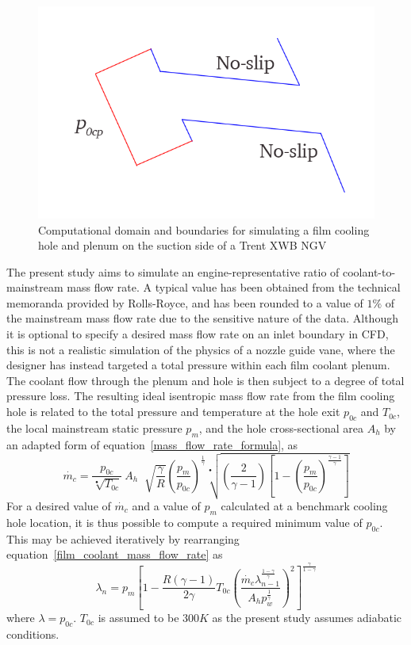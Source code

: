 \documentclass[a4paper, 11pt, oneside]{report}
\begin{document}
\begin{figure}[H]
	\centering
	\includegraphics[width=.45\textwidth]{figs/film_cooling_hole_boundary_conditions.png}
	\caption{Computational domain and boundaries for simulating a film cooling hole and plenum on the suction side of a Trent XWB NGV}
    \label{fig:film_cooling_hole_boundary_conditions}
\end{figure}

The present study aims to simulate an engine-representative ratio of coolant-to-mainstream mass flow rate. A typical value has been obtained from the technical memoranda provided by Rolls-Royce, and has been rounded to a value of $1\%$ of the mainstream mass flow rate due to the sensitive nature of the data. Although it is optional to specify a desired mass flow rate on an inlet boundary in CFD, this is not a realistic simulation of the physics of a nozzle guide vane, where the designer has instead targeted a total pressure within each film coolant plenum. The coolant flow through the plenum and hole is then subject to a degree of total pressure loss. The resulting ideal isentropic mass flow rate from the film cooling hole is related to the total pressure and temperature at the hole exit $p_{0c}$ and $T_{0c}$, the local mainstream static pressure $p_m$, and the hole cross-sectional area $A_h$ by an adapted form of equation~\ref{mass_flow_rate_formula}, as
\begin{equation}\label{film_coolant_mass_flow_rate}
\dot{m_c} =
\frac{p_{0c}}{\sqrt[•]{T_{0c}}} \>
A_h \;
\sqrt[]{\frac{\gamma}{R}}
\left(
    \frac{p_m}{p_{0c}}
\right)^\frac{1}{\gamma}
\sqrt[•]{
	\left(
		\frac{2}{\gamma - 1}  
	\right)
	\left[
		1 - \left( \frac{p_m}{p_{0c}} \right)^\frac{\gamma-1}{\gamma}
	\right] 
}
\end{equation}
For a desired value of $\dot{m_c}$ and a value of $p_m$ calculated at a benchmark cooling hole location, it is thus possible to compute a required minimum value of $p_{0c}$. This may be achieved iteratively by rearranging equation~\ref{film_coolant_mass_flow_rate} as
\begin{equation}\label{coolant_mass_flow_rate}
\lambda_n =
p_m
\left[
	1-
	\frac{
		R\left(\gamma-1\right)
	}{
		2\gamma
	}
	T_{0c}
	\left(
		\frac{
			\dot{m_c}
			\lambda_{n-1}^{\frac{1-\gamma}{\gamma}}
		}{
			A_h
			p_w^{\frac{1}{\gamma}}
		}
	\right)
	^2
\right]
^{\frac{\gamma}{1-\gamma}}
\end{equation}
where $\lambda=p_{0c}$. $T_{0c}$ is assumed to be $300 K$ as the present study assumes adiabatic conditions. 
\end{document}
